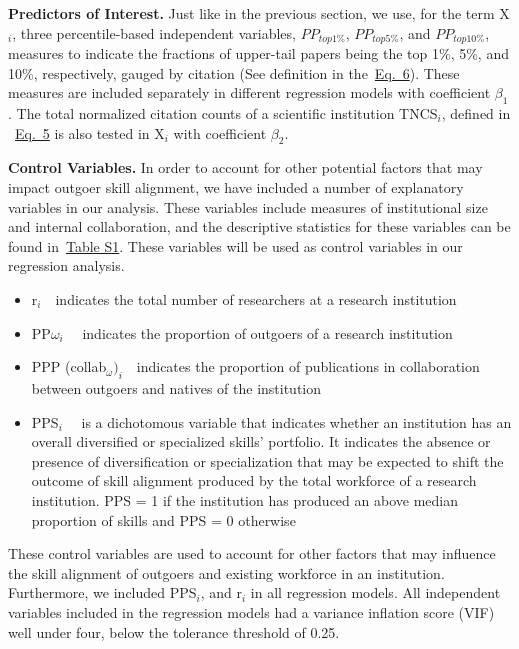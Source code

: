 \documentclass[draft,final]{vutinfth} %
\begin{document}
\textbf{Predictors of Interest.} Just like in the previous section, we use, for the term X$_i$, three percentile-based independent variables, ${ PP }_{top1\%}$, ${ PP }_{top5\%}$, and ${ PP }_{top10\%}$, measures to indicate the fractions of upper-tail papers being the top 1\%, 5\%, and 10\%, respectively, gauged by citation (See definition in the~\hyperref[Definition of skills section]{Eq.~6}). These measures are included separately in different regression models with coefficient $\beta_1$. The total normalized citation counts of a scientific institution TNCS$_i$, defined in ~\hyperref[Definition of skills section]{Eq.~5} is also tested in X$_i$ with coefficient $\beta_2$.

\textbf{Control Variables.} In order to account for other potential factors that may impact outgoer skill alignment, we have included a number of explanatory variables in our analysis. These variables include measures of institutional size and internal collaboration, and the descriptive statistics for these variables can be found in~\hyperref[Table S1]{Table S1}. These variables will be used as control variables in our regression analysis.

\begin{itemize} 
  \item r$_{i}$~\textequal~indicates the total number of researchers at a research institution 
  \item PP$\omega_{i}$~\textequal~ indicates the proportion of outgoers of a research institution
  \item PPP (collab$_{\omega})_{i}$~\textequal~indicates the proportion of publications in collaboration between outgoers and natives of the institution
  \item PPS$_{i}$~\textequal~ is a dichotomous variable that indicates whether an institution has an overall diversified or specialized skills' portfolio. It indicates the absence or presence of diversification or specialization that may be expected to shift the outcome of skill alignment produced by the total workforce of a research institution. PPS = 1 if the institution has produced an above median proportion of skills and PPS = 0 otherwise 
\end{itemize}

These control variables are used to account for other factors that may influence the skill alignment of outgoers and existing workforce in an institution. Furthermore, we included PPS$_{i}$, and r$_{i}$ in all regression models. All independent variables included in the regression models had a variance inflation score (VIF) well under four, below the tolerance threshold of 0.25.
\end{document}
